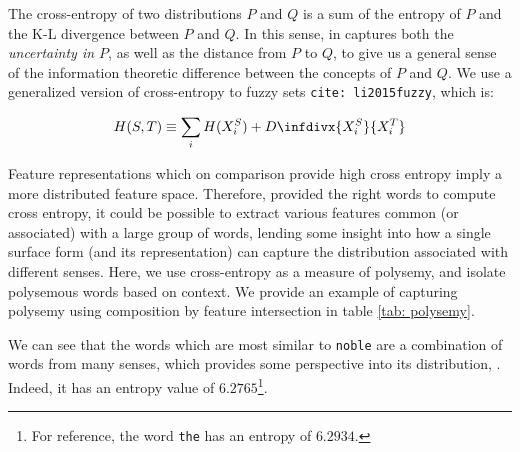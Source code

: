 \documentclass{book}
\newcommand{\infdiv}{D\infdivx}
\newcommand{\citep}[1]{\texttt{cite: #1}}
\begin{document}
The cross-entropy of two distributions $P$ and $Q$ is a sum of the entropy of
$P$ and the K-L divergence between $P$ and $Q$. In this sense, in captures both
the \emph{uncertainty in $P$}, as well as the distance from $P$ to $Q$, to give
us a general sense of the information theoretic difference between the concepts
of $P$ and $Q$. We use a generalized version of cross-entropy to fuzzy sets
\citep{li2015fuzzy}, which is:

{\footnotesize
\begin{equation*}
   H(S, T) \equiv \sum_i H(X^S_i) + \infdiv{X^S_i}{X^T_i}
\end{equation*}
}

Feature representations which on comparison provide high cross entropy imply a
more distributed feature space. Therefore, provided the right words to compute
cross entropy, it could be possible to extract various features common (or
associated) with a large group of words, lending some insight into how a single
surface form (and its representation) can capture the distribution associated
with different senses. Here, we use cross-entropy as a measure of polysemy, and
isolate polysemous words based on context. We provide an example of capturing
polysemy using composition by feature intersection in table \ref{tab:
polysemy}. 

We can see that the words which are most similar to \texttt{noble} are a
combination of words from many senses, which provides some perspective into its
distribution, . Indeed, it has an entropy value of $6.2765$\footnote{For
reference, the word \texttt{the} has an entropy of $6.2934$.}.
\end{document}
